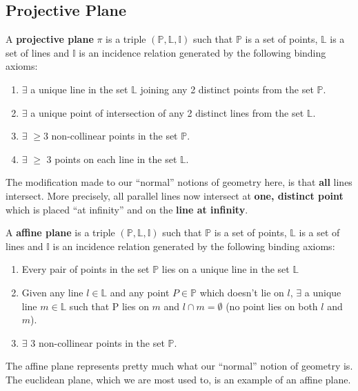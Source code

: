 \documentclass{article}
\begin{document}
\subsection{Projective Plane}
\begin{defin}
    A \textbf{projective plane} $\pi$ is a triple $(\mathbb{P},\mathbb{L},\mathbb{I})$ such that $\mathbb{P}$ is a set of points, $\mathbb{L}$ is a set of lines and $\mathbb{I}$ is an incidence relation generated by the following binding axioms:
    \begin{enumerate}
        \item $\exists$ a unique line in the set $\mathbb{L}$ joining any 2 distinct points from the set $\mathbb{P}$.
        \item $\exists$ a unique point of intersection of any 2 distinct lines from the set $\mathbb{L}$.
        \item $\exists$ $\ge 3$ non-collinear points in the set $\mathbb{P}$.
        \item $\exists$ $\ge$ 3 points on each line in the set $\mathbb{L}$.
    \end{enumerate}
\end{defin}
 The modification made to our \enquote{normal} notions of geometry here, is that \textbf{all} lines intersect. More precisely, all parallel lines now intersect at \textbf{one, distinct point} which is placed \enquote{at infinity} and on the \textbf{line at infinity}.
\begin{defin}
    A \textbf{affine plane} is a triple $(\mathbb{P},\mathbb{L},\mathbb{I})$ such that $\mathbb{P}$ is a set of points, $\mathbb{L}$ is a set of lines and $\mathbb{I}$ is an incidence relation generated by the following binding axioms:
    \begin{enumerate}
        \item Every pair of points in the set $\mathbb{P}$ lies on a unique line in the set $\mathbb{L}$
        \item Given any line $l\in \mathbb{L}$ and any point $P\in\mathbb{P}$ which doesn't lie on $l$, $\exists$ a unique line $m\in\mathbb{L}$ such that P lies on $m$ and $l \cap m = \emptyset$ (no point lies on both $l$ and $m$).
        \item $\exists$ $3$ non-collinear points in the set $\mathbb{P}$.
    \end{enumerate}
\end{defin}
 The affine plane represents pretty much what our \enquote{normal} notion of geometry is. The euclidean plane, which we are most used to, is an example of an affine plane.
\end{document}
